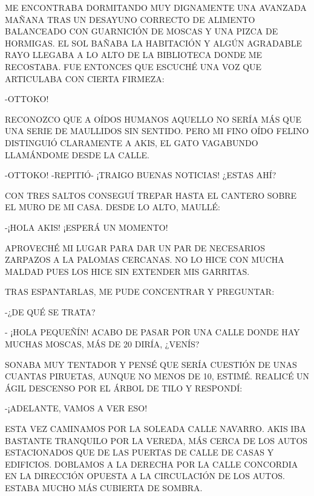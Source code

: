 \newpage
{}

ME ENCONTRABA DORMITANDO MUY DIGNAMENTE UNA AVANZADA MAÑANA TRAS UN DESAYUNO CORRECTO DE ALIMENTO BALANCEADO CON GUARNICIÓN DE MOSCAS Y UNA PIZCA DE HORMIGAS. EL SOL BAÑABA LA HABITACIÓN Y ALGÚN AGRADABLE RAYO LLEGABA A LO ALTO DE LA BIBLIOTECA DONDE ME RECOSTABA. FUE ENTONCES QUE ESCUCHÉ UNA VOZ QUE ARTICULABA CON CIERTA FIRMEZA:

-OTTOKO!

RECONOZCO QUE A OÍDOS HUMANOS AQUELLO NO SERÍA MÁS QUE UNA SERIE DE MAULLIDOS SIN SENTIDO. PERO MI FINO OÍDO FELINO DISTINGUIÓ CLARAMENTE A AKIS, EL GATO VAGABUNDO LLAMÁNDOME DESDE LA CALLE.

-OTTOKO! -REPITIÓ- ¡TRAIGO BUENAS NOTICIAS! ¿ESTAS AHÍ?

\newpage
{}
CON TRES SALTOS CONSEGUÍ TREPAR HASTA EL CANTERO SOBRE EL MURO DE MI CASA. DESDE LO ALTO, MAULLÉ:

-¡HOLA AKIS! ¡ESPERÁ UN MOMENTO!

APROVECHÉ MI LUGAR PARA DAR UN PAR DE NECESARIOS ZARPAZOS A LA PALOMAS CERCANAS. NO LO HICE CON MUCHA MALDAD PUES LOS HICE SIN EXTENDER MIS GARRITAS.

TRAS ESPANTARLAS, ME PUDE CONCENTRAR Y PREGUNTAR:

-¿DE QUÉ SE TRATA?

- ¡HOLA PEQUEÑÍN! ACABO DE PASAR POR UNA CALLE DONDE HAY MUCHAS MOSCAS, MÁS DE 20 DIRÍA, ¿VENÍS?

SONABA MUY TENTADOR Y PENSÉ QUE SERÍA CUESTIÓN DE UNAS CUANTAS PIRUETAS, AUNQUE NO MENOS DE 10, ESTIMÉ. REALICÉ UN ÁGIL DESCENSO POR EL ÁRBOL DE TILO Y RESPONDÍ:

-¡ADELANTE, VAMOS A VER ESO!


\newpage
{}
ESTA VEZ CAMINAMOS POR LA SOLEADA CALLE NAVARRO. AKIS IBA BASTANTE TRANQUILO POR LA VEREDA, MÁS CERCA DE LOS AUTOS ESTACIONADOS QUE DE LAS PUERTAS DE CALLE DE CASAS Y EDIFICIOS. DOBLAMOS A LA DERECHA POR LA CALLE CONCORDIA EN LA DIRECCIÓN OPUESTA A LA CIRCULACIÓN DE LOS AUTOS. ESTABA MUCHO MÁS CUBIERTA DE SOMBRA.

